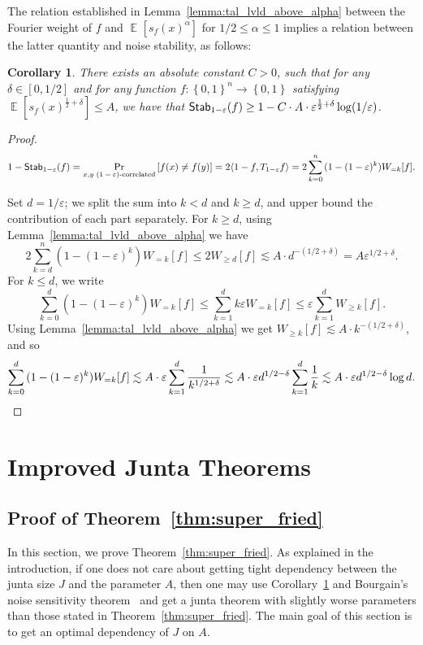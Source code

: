 \documentclass[10pt]{article}
\newcommand{\set}[1]{{\left\{#1\right\}}}
\newcommand{\Prob}[2]{{\Pr_{#1}\left[#2\right]}}
\newcommand{\Expect}[2]{{\mathop{\mathbb E}_{#1}\left[#2\right]}}
\newcommand{\power}[1]{\set{0,1}^{#1}}
\newcommand{\inner}[2]{\langle #1,#2\rangle}
\newcommand{\eps}{\varepsilon}
\renewcommand{\ll}{\lesssim}
\newtheorem{corollary}[thm]{Corollary}
\begin{document}
The relation established in Lemma~\ref{lemma:tal_lvld_above_alpha} between the Fourier weight of $f$ and $\Expect{}{s_f(x)^{\alpha}}$
for $1/2\leq\alpha\leq 1$ implies a relation between the latter quantity and noise stability, as follows:
\begin{corollary}\label{corr:noise_stable}
  There exists an absolute constant $C>0$, such that for any $\delta\in[0,1/2]$ and for any function $f\colon\power{n}\to\power{}$ satisfying
  $\Expect{}{s_f(x)^{\frac{1}{2}+\delta}}\leq A$, we have that ${\sf Stab}_{1-\eps}(f)\geq 1 - C\cdot A\cdot \eps^{\frac{1}{2} + \delta}\log(1/\eps)$.
\end{corollary}
\begin{proof}
  \[
  1-{\sf Stab}_{1-\eps}(f) = \Prob{x,y\text{ $(1-\eps)$-correlated}}{f(x)\neq f(y)}
  =2\inner{1-f}{T_{1-\eps} f}
  =2\sum\limits_{k=0}^n{(1-(1-\eps)^{k})W_{=k}[f]}.
  \]

  Set $d = 1/\eps$; we split the sum into $k< d$ and $k \geq  d$, and upper bound the contribution of each part separately.
  For $k\geq d$, using Lemma~\ref{lemma:tal_lvld_above_alpha} we have
  \[
  2\sum\limits_{k=d}^n{(1-(1-\eps)^{k})W_{=k}[f]}
  \leq 2W_{\geq d}[f]\ll A\cdot d^{-(1/2+\delta)} = A\eps^{1/2+\delta}.
  \]
  For $k\leq d$, we write
  \[
  \sum\limits_{k=0}^d{(1-(1-\eps)^{k})W_{=k}[f]}
  \leq\sum\limits_{k=1}^d{k\eps W_{=k}[f]}
  \leq \eps \sum\limits_{k=1}^{d} W_{\geq k}[f].
  \]
  Using Lemma~\ref{lemma:tal_lvld_above_alpha} we get $W_{\geq k}[f]\ll A\cdot k^{-(1/2+\delta)}$, and so
  \[
  \sum\limits_{k=0}^d{(1-(1-\eps)^{k})W_{=k}[f]}
  \ll A\cdot \eps \sum\limits_{k=1}^{d} \frac{1}{k^{1/2+\delta}}
  \ll A \cdot \eps d^{1/2-\delta} \sum\limits_{k=1}^{d} \frac{1}{k}
  \ll A \cdot \eps d^{1/2-\delta} \log d.
  \qedhere
  \]
\end{proof}
\setcounter{equation}{2}
\section{Improved Junta Theorems}\label{sec:super_fried}
\subsection{Proof of Theorem~\ref{thm:super_fried}}
In this section, we prove Theorem~\ref{thm:super_fried}. As explained in the introduction, if one does not care about getting tight dependency
between the junta size $J$ and the parameter $A$, then one may use Corollary~\ref{corr:noise_stable} and Bourgain's noise sensitivity theorem~\cite{Bourgain,kindler2018gaussian}
and get a junta theorem with slightly worse parameters than those stated in Theorem~\ref{thm:super_fried}. The main goal of this section
is to get an optimal dependency of $J$ on $A$.
\end{document}

